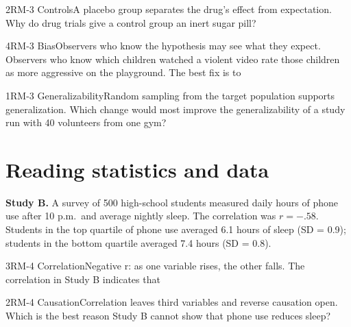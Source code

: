 \documentclass[11pt]{article}
\begin{document}
\begin{q}{2}{RM-3 Controls}{A placebo group separates the drug's effect from expectation.}
Why do drug trials give a control group an inert sugar pill?
\end{q}

\begin{q}{4}{RM-3 Bias}{Observers who know the hypothesis may see what they expect.}
Observers who know which children watched a violent video rate those children as more aggressive on the playground. The best fix is to
\end{q}

\begin{q}{1}{RM-3 Generalizability}{Random sampling from the target population supports generalization.}
Which change would most improve the generalizability of a study run with 40 volunteers from one gym?
\end{q}

\section{Reading statistics and data}

\begin{stimulus}
\textbf{Study B.} A survey of 500 high-school students measured daily hours of phone use after 10 p.m.\ and average nightly sleep. The correlation was \(r = -.58\). Students in the top quartile of phone use averaged 6.1 hours of sleep (SD = 0.9); students in the bottom quartile averaged 7.4 hours (SD = 0.8).
\end{stimulus}

\begin{q}{3}{RM-4 Correlation}{Negative r: as one variable rises, the other falls.}
The correlation in Study B indicates that
\end{q}

\begin{q}{2}{RM-4 Causation}{Correlation leaves third variables and reverse causation open.}
Which is the best reason Study B cannot show that phone use reduces sleep?
\end{q}
\end{document}
